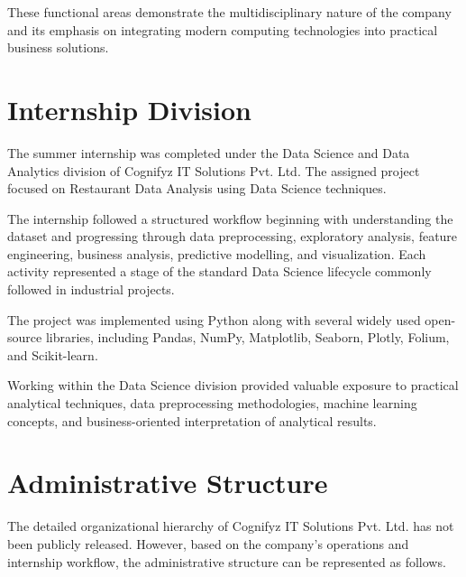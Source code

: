 \documentclass[12pt,a4paper]{report}
\begin{document}
These functional areas demonstrate the multidisciplinary nature of the company and its emphasis on integrating modern computing technologies into practical business solutions.


\section{Internship Division}

The summer internship was completed under the Data Science and Data Analytics division of Cognifyz IT Solutions Pvt. Ltd. The assigned project focused on Restaurant Data Analysis using Data Science techniques.

The internship followed a structured workflow beginning with understanding the dataset and progressing through data preprocessing, exploratory analysis, feature engineering, business analysis, predictive modelling, and visualization. Each activity represented a stage of the standard Data Science lifecycle commonly followed in industrial projects.

The project was implemented using Python along with several widely used open-source libraries, including Pandas, NumPy, Matplotlib, Seaborn, Plotly, Folium, and Scikit-learn.

Working within the Data Science division provided valuable exposure to practical analytical techniques, data preprocessing methodologies, machine learning concepts, and business-oriented interpretation of analytical results.


\section{Administrative Structure}

The detailed organizational hierarchy of Cognifyz IT Solutions Pvt. Ltd. has not been publicly released. However, based on the company's operations and internship workflow, the administrative structure can be represented as follows.
\end{document}
